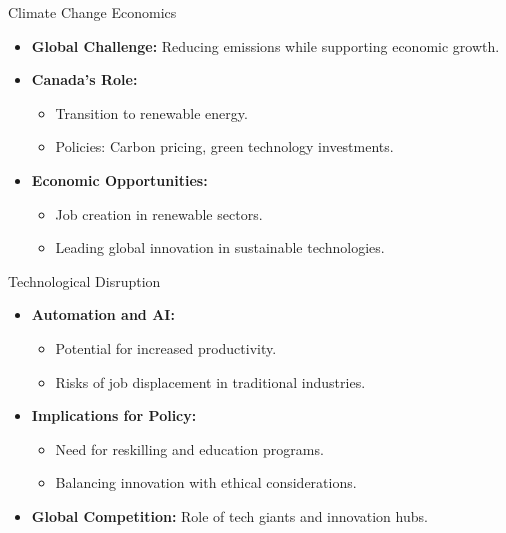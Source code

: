 \documentclass{beamer}
\begin{document}

\begin{frame}{Climate Change Economics}
  \begin{itemize}
    \item \textbf{Global Challenge:} Reducing emissions while supporting economic growth.
    \item \textbf{Canada’s Role:}
      \begin{itemize}
        \item Transition to renewable energy.
        \item Policies: Carbon pricing, green technology investments.
      \end{itemize}
    \item \textbf{Economic Opportunities:}
      \begin{itemize}
        \item Job creation in renewable sectors.
        \item Leading global innovation in sustainable technologies.
      \end{itemize}
  \end{itemize}
\end{frame}


\begin{frame}{Technological Disruption}
  \begin{itemize}
    \item \textbf{Automation and AI:}
      \begin{itemize}
        \item Potential for increased productivity.
        \item Risks of job displacement in traditional industries.
      \end{itemize}
    \item \textbf{Implications for Policy:}
      \begin{itemize}
        \item Need for reskilling and education programs.
        \item Balancing innovation with ethical considerations.
      \end{itemize}
    \item \textbf{Global Competition:} Role of tech giants and innovation hubs.
  \end{itemize}
\end{frame}
\end{document}
